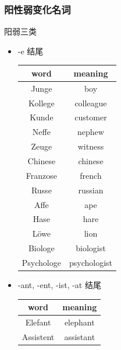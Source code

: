 \subsubsection{阳性弱变化名词}
阳弱三类
\begin{itemize}
    \item -e 结尾
          \begin{center}
              \begin{tabular}{|c|c|}
                  \hline
                  \rowcolor{gray}
                  word       & meaning      \\
                  \hline
                  Junge      & boy          \\
                  Kollege    & colleague    \\
                  Kunde      & customer     \\
                  Neffe      & nephew       \\
                  Zeuge      & witness      \\
                  \hline
                  Chinese    & chinese      \\
                  Franzose   & french       \\
                  Russe      & russian      \\
                  \hline
                  Affe       & ape          \\
                  Hase       & hare         \\
                  Löwe       & lion         \\
                  \hline
                  Biologe    & biologist    \\
                  Psychologe & psychologist \\
                  \hline
              \end{tabular}
          \end{center}
    \item -ant, -ent, -ist, -at 结尾
          \begin{center}
              \begin{tabular}{|c|c|}
                  \hline
                  \rowcolor{gray}
                  word                   & meaning              \\
                  \hline
                  Elefant                & elephant             \\
                  \hline
                  Assistent              & assistant            \\

\end{tabular}
\end{center}
\end{itemize}
